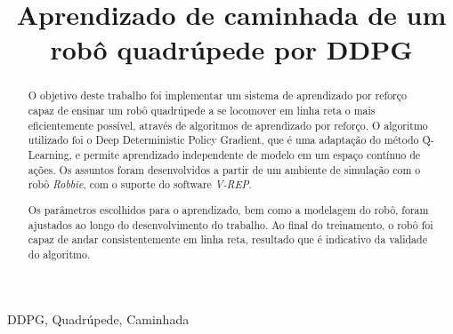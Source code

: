 \documentclass[twoside,conference,a4paper]{IEEEtran}
\begin{document}
\renewcommand{\IEEEkeywordsname}{Palavras-chave}


\title{Aprendizado de caminhada de um robô quadrúpede por DDPG}
\author{%
}


\maketitle

\begin{abstract}
 O objetivo deste trabalho foi implementar um sistema de aprendizado por reforço capaz de ensinar um robô quadrúpede a se locomover em linha reta o mais eficientemente possível, através de algoritmos de aprendizado por reforço. O algoritmo utilizado foi o Deep Deterministic Policy Gradient, que é uma adaptação do método Q-Learning, e permite aprendizado independente de modelo em um espaço contínuo de ações. Os assuntos foram desenvolvidos a partir de um ambiente de simulação com o robô \textit{Robbie}, com o suporte do software \textit{V-REP}. 
 
 Os parâmetros escolhidos para o aprendizado, bem como a modelagem do robô, foram ajustados ao longo do desenvolvimento do trabalho. Ao final do treinamento, o robô foi capaz de andar consistentemente em linha reta, resultado que é indicativo da validade do algoritmo.
\end{abstract}

\begin{IEEEkeywords}
 DDPG, Quadrúpede, Caminhada
\end{IEEEkeywords}
\end{document}
